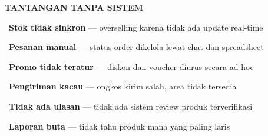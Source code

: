 \documentclass[a4paper]{article}
\begin{document}
\noindent
\begin{minipage}[t]{0.485\textwidth}
    \colorbox{RedLight}{%
        \begin{minipage}{\dimexpr\textwidth-14pt}
            \vspace{5pt}
            {\fontsize{10}{13}\selectfont\bfseries\color{RedText} TANTANGAN TANPA SISTEM}
            \vspace{5pt}
        \end{minipage}}
    \vspace{6pt}

    {\fontsize{9.5}{13}\selectfont\color{TextDark}%
    \textbullet\ \textbf{Stok tidak sinkron} --- overselling karena tidak ada update real-time\par\vspace{4pt}%
    \textbullet\ \textbf{Pesanan manual} --- status order dikelola lewat chat dan spreadsheet\par\vspace{4pt}%
    \textbullet\ \textbf{Promo tidak teratur} --- diskon dan voucher diurus secara ad hoc\par\vspace{4pt}%
    \textbullet\ \textbf{Pengiriman kacau} --- ongkos kirim salah, area tidak tersedia\par\vspace{4pt}%
    \textbullet\ \textbf{Tidak ada ulasan} --- tidak ada sistem review produk terverifikasi\par\vspace{4pt}%
    \textbullet\ \textbf{Laporan buta} --- tidak tahu produk mana yang paling laris}%
\end{minipage}%
\hfill%
\end{document}

